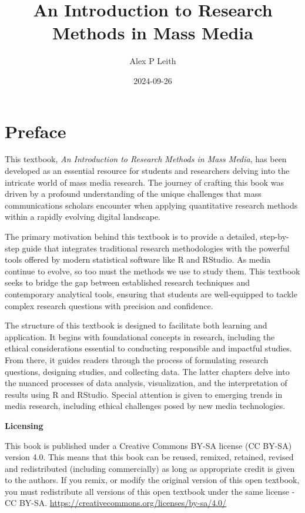 \documentclass[
]{book}
\title{An Introduction to Research Methods in Mass Media}
\author{Alex P Leith}
\date{2024-09-26}
\begin{document}
\maketitle

{
\setcounter{tocdepth}{1}
\tableofcontents
}
\chapter*{Preface}\label{preface}

This textbook, \emph{An Introduction to Research Methods in Mass Media}, has been developed as an essential resource for students and researchers delving into the intricate world of mass media research. The journey of crafting this book was driven by a profound understanding of the unique challenges that mass communications scholars encounter when applying quantitative research methods within a rapidly evolving digital landscape.

The primary motivation behind this textbook is to provide a detailed, step-by-step guide that integrates traditional research methodologies with the powerful tools offered by modern statistical software like R and RStudio. As media continue to evolve, so too must the methods we use to study them. This textbook seeks to bridge the gap between established research techniques and contemporary analytical tools, ensuring that students are well-equipped to tackle complex research questions with precision and confidence.

The structure of this textbook is designed to facilitate both learning and application. It begins with foundational concepts in research, including the ethical considerations essential to conducting responsible and impactful studies. From there, it guides readers through the process of formulating research questions, designing studies, and collecting data. The latter chapters delve into the nuanced processes of data analysis, visualization, and the interpretation of results using R and RStudio. Special attention is given to emerging trends in media research, including ethical challenges posed by new media technologies.

\textbf{Licensing}

This book is published under a Creative Commons BY-SA license (CC BY-SA) version 4.0. This means that this book can be reused, remixed, retained, revised and redistributed (including commercially) as long as appropriate credit is given to the authors. If you remix, or modify the original version of this open textbook, you must redistribute all versions of this open textbook under the same license - CC BY-SA. \url{https://creativecommons.org/licenses/by-sa/4.0/}
\end{document}
